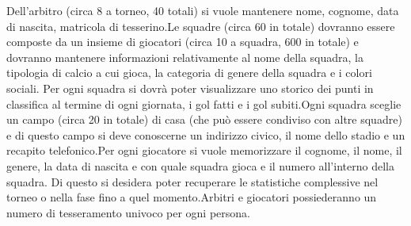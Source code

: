 \documentclass[12pt, openany]{article}
\theoremstyle{definition}
\theoremstyle{plain}
\theoremstyle{remark}
\begin{document}
		Dell’arbitro (circa 8 a torneo, 40 totali) si vuole mantenere nome, cognome, data di nascita, matricola di tesserino.Le squadre (circa 60 in totale) dovranno essere composte da un insieme di giocatori (circa 10 a squadra, 600 in totale) e dovranno mantenere informazioni relativamente al nome della squadra, la tipologia di calcio a cui gioca, la categoria di genere della squadra e i colori sociali. Per ogni squadra si dovrà poter visualizzare uno storico dei punti in classifica al termine di ogni giornata, i gol fatti e i gol subiti.Ogni squadra sceglie un campo (circa 20 in totale) di casa (che può essere condiviso con altre squadre) e di questo campo si deve conoscerne un indirizzo civico, il nome dello stadio e un recapito telefonico.Per ogni giocatore si vuole memorizzare il cognome, il nome, il genere, la data di nascita e con quale squadra gioca e il numero all’interno della squadra. Di questo si desidera poter recuperare le statistiche complessive nel torneo o nella fase fino a quel momento.Arbitri e giocatori possiederanno un numero di tesseramento univoco per ogni persona.
\end{document}
